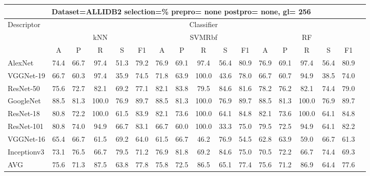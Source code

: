 \documentclass[12pt,italian]{article}
\begin{document}
\begin{tiny}
\begin{longtable}{lcccccccccccccccc}
\toprule
\multicolumn{16}{c}{Dataset=ALLIDB2 selection=\% prepro= none postpro= none, gl= 256} \\ 
\toprule
Descriptor & \multicolumn{15}{c}{Classifier} \\ 
& \multicolumn{5}{c}{kNN} & \multicolumn{5}{c}{SVMRbf} & \multicolumn{5}{c}{RF} \\ 
& A & P & R & S & F1 & A & P & R & S & F1 & A & P & R & S & F1 \\ 
\midrule
AlexNet & 74.4 & 66.7 & 97.4 & 51.3 & 79.2 & 76.9 & 69.1 & 97.4 & 56.4 & 80.9 & 76.9 & 69.1 & 97.4 & 56.4 & 80.9 \\ 
VGGNet-19 & 66.7 & 60.3 & 97.4 & 35.9 & 74.5 & 71.8 & 63.9 & 100.0 & 43.6 & 78.0 & 66.7 & 60.7 & 94.9 & 38.5 & 74.0 \\ 
ResNet-50 & 75.6 & 72.7 & 82.1 & 69.2 & 77.1 & 82.1 & 83.8 & 79.5 & 84.6 & 81.6 & 78.2 & 76.2 & 82.1 & 74.4 & 79.0 \\ 
GoogleNet & 88.5 & 81.3 & 100.0 & 76.9 & 89.7 & 88.5 & 81.3 & 100.0 & 76.9 & 89.7 & 88.5 & 81.3 & 100.0 & 76.9 & 89.7 \\ 
ResNet-18 & 80.8 & 72.2 & 100.0 & 61.5 & 83.9 & 82.1 & 73.6 & 100.0 & 64.1 & 84.8 & 82.1 & 73.6 & 100.0 & 64.1 & 84.8 \\ 
ResNet-101 & 80.8 & 74.0 & 94.9 & 66.7 & 83.1 & 66.7 & 60.0 & 100.0 & 33.3 & 75.0 & 79.5 & 72.5 & 94.9 & 64.1 & 82.2 \\ 
VGGNet-16 & 65.4 & 66.7 & 61.5 & 69.2 & 64.0 & 61.5 & 66.7 & 46.2 & 76.9 & 54.5 & 62.8 & 63.9 & 59.0 & 66.7 & 61.3 \\ 
Inceptionv3 & 73.1 & 76.5 & 66.7 & 79.5 & 71.2 & 76.9 & 81.8 & 69.2 & 84.6 & 75.0 & 70.5 & 72.2 & 66.7 & 74.4 & 69.3 \\ 
\hline
AVG & 75.6 & 71.3 & 87.5 & 63.8 & 77.8 & 75.8 & 72.5 & 86.5 & 65.1 & 77.4 & 75.6 & 71.2 & 86.9 & 64.4 & 77.6 \\ 
\hline
\bottomrule
\end{longtable} 

 \pagebreak 
\end{tiny} 
 
\end{document}

